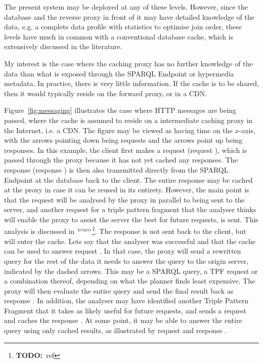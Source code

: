 \documentclass[a4paper, 12pt]{article}
\newcommand*\circled[1]{\tikz[baseline=(char.base)]{
            \node[shape=circle,draw,inner sep=2pt] (char) {#1};}}
\newcommand{\todo}[1]{\ensuremath{^{\textrm{\tiny{TODO}\normalsize}}}\footnote{\textbf{TODO:}~#1}}
\begin{document}
The present system may be deployed at any of these levels. However,
since the database and the reverse proxy in front of it may have
detailed knowledge of the data, e.g. a complete data profile with
statistics to optimise join order, these levels have much in common
with a conventional database cache, which is extensively discussed in
the literature.

My interest is the case where the caching proxy has no further
knowledge of the data than what is exposed through the SPARQL Endpoint
or hypermedia metadata. In practice, there is very little
information. If the cache is to be shared, then it would typically
reside on the forward proxy, or in a CDN. 

Figure~\ref{fig:messaging} illustrates the case where HTTP messages
are being passed, where the cache is assumed to reside on a
intermediate caching proxy in the Internet, i.e. a CDN. The figure may
be viewed as having time on the $x$-axis, with the arrows pointing
down being requests and the arrows point up being responses. In this
example, the client first makes a request (request \circled{1}), which
is passed through the proxy because it has not yet cached any
responses. The response (response \circled{1}) is then also
transmitted directly from the SPARQL Endpoint at the database back to
the client. The entire response may be cached at the proxy in case it
can be reused in its entirety. However, the main point is that the
request will be analysed by the proxy in parallel to being sent to the
server, and another request \circled{2} for a triple pattern fragment
that the analyser thinks will enable the proxy to assist the server
the best for future requests, is sent. This analysis is discussed in
\todo{ref}. The response \circled{2} is not sent back to the client,
but will enter the cache. Lets say that the analyser was successful
and that the cache can be used to answer request \circled{3}. In that
case, the proxy will send a rewritten query for the rest of the data
it needs to answer the query to the origin server, indicated by the
dashed arrows. This may be a SPARQL query, a TPF request or a
combination thereof, depending on what the planner finds least
expensive. The proxy will then evaluate the entire query and send the
final result back as response \circled{3}. In addition, the analyser
may have identified another Triple Pattern Fragment that it takes as
likely useful for future requests, and sends a request and caches the
response \circled{4}. At some point, it may be able to answer the
entire query using only cached results, as illustrated by request and
response \circled{5}.
\end{document}
